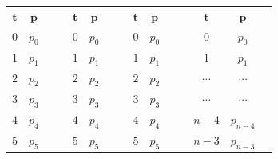 \documentclass
[twocolumn,
secnumarabic,
nobibnotes,
aps,
prl,
reprint,
groupedaddress,
amsmath,
amssymb,
]{revtex4-2}
\begin{document}
\begin{center}
  \begin{tabular}{|c|c|cc|c|c|cc|c|c|cc|c|c|c}
    \cline{1-2} \cline{5-6} \cline{9-10} \cline{13-14}
    $\mathbf{t}$ & $\mathbf{p}$                  &                &  & $\mathbf{t}$ & $\mathbf{p}$                  &                &  & $\mathbf{t}$ & $\mathbf{p}$                  &                &  & $\mathbf{t}$ & $\mathbf{p}$                      &                \\ \cline{1-2} \cline{5-6} \cline{9-10} \cline{13-14}
    $0$        & \cellcolor[HTML]{C0C0C0}$p_0$ &                &  & $0$        & $p_0$                         &                &  & $0$        & $p_0$                         &                &  & ${0}$   & $p_{0}$                        &                \\ \cline{1-2} \cline{5-6} \cline{9-10} \cline{13-14}
    $1$        & \cellcolor[HTML]{C0C0C0}$p_1$ &                &  & $1$        & \cellcolor[HTML]{C0C0C0}$p_1$ &                &  & $1$        & $p_1$                         &                &  & ${1}$    & $p_{1}$                         &                \\ \cline{1-2} \cline{5-6} \cline{9-10} \cline{13-14}
    $2$        & \cellcolor[HTML]{C0C0C0}$p_2$ &                &  & $2$        & \cellcolor[HTML]{C0C0C0}$p_2$ &                &  & $2$        & \cellcolor[HTML]{C0C0C0}$p_2$ &       &  & $\cdots$    & $\cdots$                         &       \\ \cline{1-2} \cline{5-6} \cline{9-10} \cline{13-14}
    $3$        & \cellcolor[HTML]{C0C0C0}$p_3$ &                &  & $3$        & \cellcolor[HTML]{C0C0C0}$p_3$ &                &  & $3$        & \cellcolor[HTML]{C0C0C0}$p_3$ &       &  & $\cdots$    & $\cdots$                         &       \\ \cline{1-2} \cline{5-6} \cline{9-10} \cline{13-14}
    $4$        & \cellcolor[HTML]{A2E4F6}$p_4$ &                &  & $4$        & \cellcolor[HTML]{C0C0C0}$p_4$ &                &  & $4$        & \cellcolor[HTML]{C0C0C0}$p_4$ &                &  & ${n-4}$    & $p_{n-4}$                         &                \\ \cline{1-2} \cline{5-6} \cline{9-10} \cline{13-14}
    $5$        & \cellcolor[HTML]{A2E4F6}$p_5$ &                &  & $5$        & \cellcolor[HTML]{A2E4F6}$p_5$ &                &  & $5$        & \cellcolor[HTML]{C0C0C0}$p_5$ &       &  & ${n-3}$    & \cellcolor[HTML]{C0C0C0}$p_{n-3}$ &       \\ \cline{1-2} \cline{5-6} \cline{9-10} \cline{13-14}

\end{tabular}
\end{center}
\end{document}
